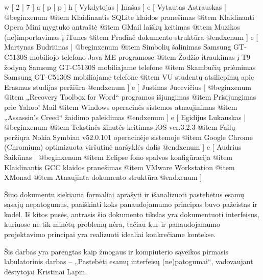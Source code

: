 
\xtable
{
  w [ 2  | 7 ]
  a [ p  | p ]
  h [ Vykdytojas | Įnašas ]
  e [ Vytautas Astrauskas 
  | @begin{xenum} 
      @item Klaidinantis SQLite klaidos pranešimas 
      @item Klaidinanti Opera Mini mygtuko antraštė 
      @item GMail laiškų keitimas 
      @item Muzikos (ne)importavimas į iTunes 
      @item Pradinė dokumento struktūra
    @end{xenum}
  ]
  e [ Martynas Budriūnas
  | @begin{xenum} 
      @item Simbolių šalinimas Samsung GT-C5130S mobiliojo telefono Java ME programose
      @item Žodžio įtraukimas į T9 žodyną Samsung GT-C5130S mobiliajame telefone
      @item Skambučių priėmimas Samsung GT-C5130S mobiliajame telefone
      @item VU studentų atsiliepimų apie Erasmus studijas peržiūra
    @end{xenum}
  ]
  e [ Justinas Jucevičius 
  | @begin{xenum} 
      @item „Recovery Toolbox for Word“ programos išjungimas
      @item Prisijungimas prie Yahoo! Mail
      @item Windows operacinės sistemos atnaujinimas
      @item „Assassin's Creed“ žaidimo paleidimas
    @end{xenum}
  ]
  e [ Egidijus Lukauskas 
  | @begin{xenum} 
      @item Tekstinės žinutės keitimas iOS ver.3.2.3
      @item Failų peržiųra Nokia Symbian v52.0.101 operacinėje sistemoje
      @item Google Chrome (Chromium) optimizuota viršutinė naršyklės dalis
    @end{xenum}
  ]
  e [ Audrius Šaikūnas 
  | @begin{xenum} 
      @item Eclipse fono spalvos konfigūracija 
      @item Klaidinantis GCC klaidos pranešimas 
      @item VMware Workstation 
      @item XMonad
      @item Atnaujinta dokumento struktūra
    @end{xenum}
  ]
}

Šiuo dokumentu siekiama formaliai aprašyti ir išanalizuoti pastebėtus esamų sąsajų nepatogumus,
paaiškinti koks panaudojamumo principas buvo pažeistas ir kodėl. Iš kitos pusės, antrasis šio
dokumento tikslas yra dokumentuoti interfeisus, kuriuose ne tik minėtų problemų nėra, tačiau kur
ir panaudojamumo projektavimo principai yra realizuoti idealiai konkrečiame kontekse.

Šis darbas yra parengtas kaip žmogaus ir kompiuterio sąveikos pirmasis labulatorinis darbas
– „Pastebėti esamų interfeisų (ne)patogumai“, vadovaujant dėstytojai Kristinai Lapin.

